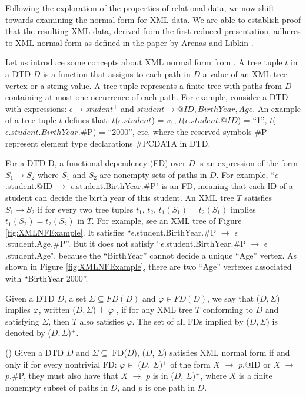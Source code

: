 Following the exploration of the properties of relational data, we now shift towards examining the normal form for XML data.  We are able to establish proof that the resulting XML data, derived from the first reduced presentation, adheres to XML normal form as defined in the paper by Arenas and Libkin \cite{journals/tods/ArenasL04}. 


Let us introduce some concepts about XML normal form from \cite{journals/tods/ArenasL04}.  A tree tuple $t$ in a DTD $D$ is a function that assigns to each path in $D$ a value of an XML tree vertex or a string value. A tree tuple represents a finite tree with
paths from $D$ containing at most one occurrence of each path. For example, consider a DTD with expressions: $\epsilon \to student^+$ and $student \to @ID, BirthYear, Age$. An example of a tree tuple $t$ defines that: 
$t$($\epsilon.student$) = $v_1$, $t$($\epsilon.student.@ID$) = ``1'', $t$($\epsilon.student.BirthYear$.\textsc{\#P}) = ``2000'', etc, where the reserved symbols  \textsc{\#P} represent element type declarations \#PCDATA in DTD.


For a DTD D, a functional dependency (FD) over $D$ is an expression of the form $S_1 \to S_2$ where $S_1$ and  $S_2$ are nonempty sets of paths in $D$. For example, ``$\epsilon$.student.@ID $\to$ $\epsilon$.student.BirthYear.\#P" is an FD, meaning that each ID of a student can decide the birth year of this student. An XML tree $T$ satisfies $S_1 \to S_2$  if for every two tree tuples $t_1$, $t_2$, $t_1(S_1) = t_2(S_1)$ implies $t_1(S_2) = t_2(S_2)$ in $T$. 
For example,  see an XML tree of Figure \ref{fig:XMLNFExample}. It satisfies  ``$\epsilon$.student.BirthYear.\#P $\to$ $\epsilon$.student.Age.\#P''. But it does not satisfy ``$\epsilon$.student.BirthYear.\#P $\to$ $\epsilon$.student.Age", because the ``BirthYear'' cannot decide a unique ``Age'' vertex. As shown in Figure \ref{fig:XMLNFExample}, there are two ``Age'' vertexes associated with ``BirthYear 2000''. 

Given a DTD $D$, a set $\Sigma \subseteq FD(D)$ and $\varphi \in FD(D)$, we say that ($D, \Sigma$)
implies $\varphi$, written ($D, \Sigma$) $\vdash \varphi$ , if for any XML tree $T$ conforming to $D$ and satisfying $\Sigma$, then $T$ also satisfies $\varphi$. The set of all FDs implied by ($D, \Sigma$) is denoted by ($D, \Sigma$)$^+$.

\begin{definition} (\cite{journals/tods/ArenasL04})
Given a DTD $D$ and $\Sigma  \subseteq$  FD($D$), ($D$, $\Sigma$) satisfies XML normal form if and only if for every nontrivial FD: $\varphi \in$ ($D$, $\Sigma$)$^+$  of the form $X$ $\to$ $p$.@ID or $X$ $\to$ $p$.\#P, they must also have that $X$ $\to$ $p$ is in ($D$, $\Sigma$)$^+$, where $X$ is a finite nonempty subset of paths in $D$, and $p$ is one path in $D$. 
\end{definition}

